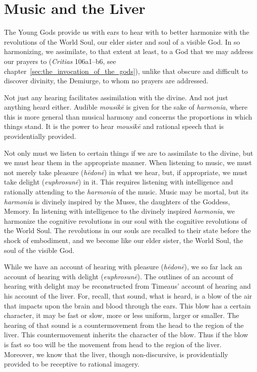
\section{Music and the Liver} %
\label{sec:audition_and_the_liver}

The Young Gods provide us with ears to hear with to better harmonize with the revolutions of the World Soul, our elder sister and soul of a visible God. In so harmonizing, we assimilate, to that extent at least, to a God that we may address our prayers to (\emph{Critias} 106a1–b6, see chapter~\ref{sec:the_invocation_of_the_gods}), unlike that obscure and difficult to discover divinity, the Demiurge, to whom no prayers are addressed.

Not just any hearing facilitates assimilation with the divine. And not just anything heard either. Audible \emph{mousikē} is given for the sake of \emph{harmonia}, where this is more general than musical harmony and concerns the proportions in which things stand. It is the power to hear \emph{mousikē} and rational speech that is providentially provided.

Not only must we listen to certain things if we are to assimilate to the divine, but we must hear them in the appropriate manner. When listening to music, we must not merely take pleasure (\emph{hēdonē}) in what we hear, but, if appropriate, we must take delight (\emph{euphrosunē}) in it. This requires listening with intelligence and rationally attending to the \emph{harmonia} of the music. Music may be mortal, but its \emph{harmonia} is divinely inspired by the Muses, the daughters of the Goddess, Memory. In listening with intelligence to the divinely inspired \emph{harmonia}, we harmonize the cognitive revolutions in our soul with the cognitive revolutions of the World Soul. The revolutions in our souls are recalled to their state before the shock of embodiment, and we become like our elder sister, the World Soul, the soul of the visible God. 

While we have an account of hearing with pleasure (\emph{hēdonē}), we so far lack an account of hearing with delight (\emph{euphrosunē}). The outlines of an account of hearing with delight may be reconstructed from Timeaus' account of hearing and his account of the liver. For, recall, that sound, what is heard, is a blow of the air that impacts upon the brain and blood through the ears. This blow has a certain character, it may be fast or slow, more or less uniform, larger or smaller. The hearing of that sound is a countermovement from the head to the region of the liver. This countermovement inherits the character of the blow. Thus if the blow is fast so too will be the movement from head to the region of the liver. Moreover, we know that the liver, though non-discursive, is providentially provided to be receptive to rational imagery. 

